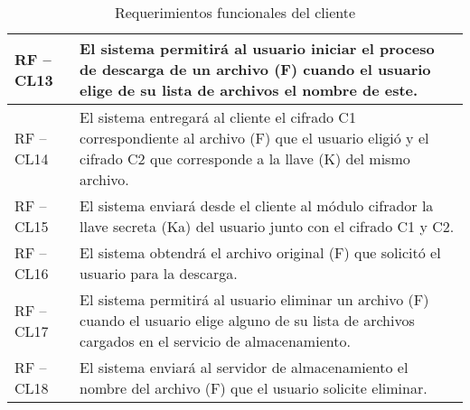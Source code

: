 \begin{table}[htb]
\begin{tabular}{| p{2cm} |  p{13.5cm} |}
RF – CL13 & El sistema permitirá al usuario iniciar el proceso de descarga de un archivo (F) cuando el usuario elige de su lista de archivos el nombre de este. \\ \hline
RF – CL14 & El sistema entregará al cliente el cifrado C1 correspondiente al archivo (F) que el usuario eligió y el cifrado C2 que corresponde a la llave (K) del mismo archivo. \\ \hline
RF – CL15 & El sistema enviará desde el cliente al módulo cifrador la llave secreta (Ka) del usuario junto con el cifrado C1 y C2.  \\ \hline
RF – CL16 & El sistema obtendrá el archivo original (F) que solicitó el usuario para la descarga.  \\ \hline
RF – CL17 & El sistema permitirá al usuario eliminar un archivo (F) cuando el usuario elige alguno de su lista de archivos cargados en el servicio de almacenamiento.  \\ \hline
RF – CL18 & El sistema enviará al servidor de almacenamiento el nombre del archivo (F) que el usuario solicite eliminar.  \\ \hline
\end{tabular}
\caption{Requerimientos funcionales del cliente}
\label{Cliente }
\end{table}



